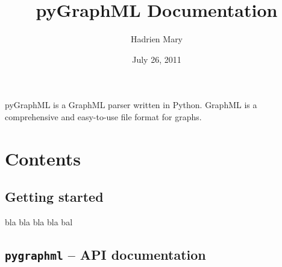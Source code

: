 \documentclass[letterpaper,10pt,english]{sphinxmanual}
\title{pyGraphML Documentation}
\date{July 26, 2011}
\author{Hadrien Mary}
\begin{document}
\maketitle
\tableofcontents
{}\label{index::doc}


pyGraphML is a GraphML parser written in Python. GraphML is a
comprehensive and easy-to-use file format for graphs.


\chapter{Contents}
\label{index:welcome-to-pygraphml-documentation}\label{index:contents}

\section{Getting started}
\label{gettingstarted:getting-started}\label{gettingstarted::doc}
bla bla bla bla bal
\label{reference:module-pygraphml}

\section{\texttt{pygraphml} -- API documentation}
\label{reference::doc}\label{reference:pygraphml-api-documentation}
\end{document}
